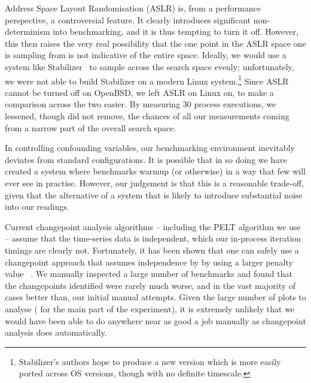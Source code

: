 \documentclass[acmsmall]{acmart}\settopmatter{printfolios=true}
\newcommand{\numpexecs}{30\xspace}
\begin{document}
Address Space Layout Randomisation (ASLR) is, from a performance perspective, a
controversial feature. It clearly introduces significant non-determinism into
benchmarking, and it is thus tempting to turn it off. However, this then raises
the very real possibility that the one point in the ASLR space one is sampling
from is not indicative of the entire space. Ideally, we would use a system like
Stabilizer~\cite{curtsinger13stabilizer} to
sample across the search space evenly; unfortunately, we were not able to build
Stabilizer on a modern Linux system.\footnote{Stabilizer's authors hope to
produce a new version which is more easily ported across OS versions, though
with no definite timescale.} Since ASLR cannot be turned off on OpenBSD,
we left ASLR on Linux on, to make a comparison across the two easier.
By measuring \numpexecs process executions, we lessened, though did not
remove, the chances of all our measurements coming from a narrow part of the
overall search space.

In controlling confounding variables, our benchmarking environment inevitably
deviates from standard configurations. It is possible that in so doing we have
created a system where benchmarks warmup (or otherwise) in a way that few will ever see in
practise. However, our judgement is that this is a reasonable trade-off,
given that the alternative of a
system that is likely to introduce substantial noise into our readings.

Current changepoint analysis algorithms -- including the PELT algorithm we use
-- assume that the time-series data is independent, which our in-process
iteration timings are clearly not. Fortunately, it has been shown that one can
safely use a changepoint approach that assumes independence by by using a larger
penalty value~\cite{antoch97effect} . We manually inspected a large number of
benchmarks and found that the
changepoints identified were rarely much worse, and in the vast majority of
cases better than, our initial manual attempts. Given the large number of
plots to analyse (\totalpexecs{} for the main part of the experiment), it is extremely unlikely that
we would have been able to do anywhere near as good a job manually as
changepoint analysis does automatically.
\end{document}

